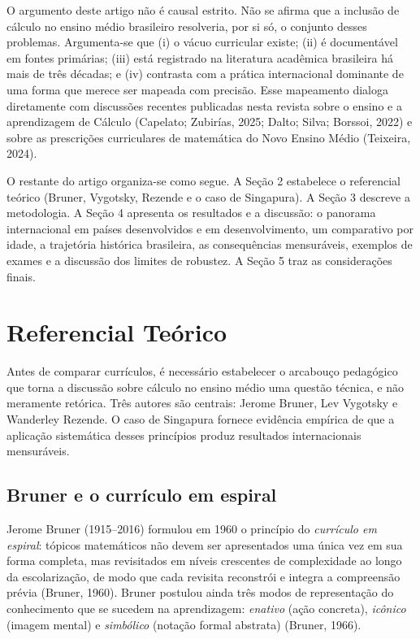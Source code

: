 \documentclass[12pt,a4paper,oneside]{article}
\begin{document}
O argumento deste artigo não é causal estrito. Não se afirma que a
inclusão de cálculo no ensino médio brasileiro resolveria, por si só, o
conjunto desses problemas. Argumenta-se que (i) o vácuo curricular
existe; (ii) é documentável em fontes primárias; (iii) está registrado na
literatura acadêmica brasileira há mais de três décadas; e (iv) contrasta
com a prática internacional dominante de uma forma que merece ser mapeada
com precisão. Esse mapeamento dialoga diretamente com discussões recentes
publicadas nesta revista sobre o ensino e a aprendizagem de Cálculo
(Capelato; Zubirías, 2025; Dalto; Silva; Borssoi, 2022) e sobre as
prescrições curriculares de matemática do Novo Ensino Médio (Teixeira,
2024).

O restante do artigo organiza-se como segue. A Seção 2 estabelece o
referencial teórico (Bruner, Vygotsky, Rezende e o caso de Singapura). A
Seção 3 descreve a metodologia. A Seção 4 apresenta os resultados e a
discussão: o panorama internacional em países desenvolvidos e em
desenvolvimento, um comparativo por idade, a trajetória histórica
brasileira, as consequências mensuráveis, exemplos de exames e a
discussão dos limites de robustez. A Seção 5 traz as considerações
finais.

\section{Referencial Teórico}

Antes de comparar currículos, é necessário estabelecer o arcabouço
pedagógico que torna a discussão sobre cálculo no ensino médio uma
questão técnica, e não meramente retórica. Três autores são centrais:
Jerome Bruner, Lev Vygotsky e Wanderley Rezende. O caso de Singapura
fornece evidência empírica de que a aplicação sistemática desses
princípios produz resultados internacionais mensuráveis.

\subsection{Bruner e o currículo em espiral}

Jerome Bruner (1915--2016) formulou em 1960 o princípio do \emph{currículo
em espiral}: tópicos matemáticos não devem ser apresentados uma única vez
em sua forma completa, mas revisitados em níveis crescentes de
complexidade ao longo da escolarização, de modo que cada revisita
reconstrói e integra a compreensão prévia (Bruner, 1960). Bruner postulou
ainda três modos de representação do conhecimento que se sucedem na
aprendizagem: \emph{enativo} (ação concreta), \emph{icônico} (imagem
mental) e \emph{simbólico} (notação formal abstrata) (Bruner, 1966).
\end{document}
